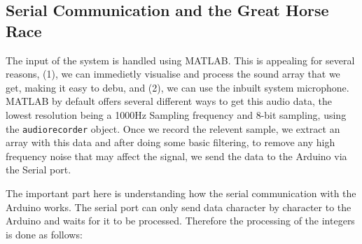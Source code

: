 \subsection{Serial Communication and the Great Horse Race}
\label{subsec:buffinp}
The input of the system is handled using MATLAB. This is appealing for several
reasons, (1), we can immedietly visualise and process the sound array that we
get, making it easy to debu, and (2), we can use the inbuilt system microphone.
MATLAB by default offers several different ways to get this audio data, the
lowest resolution being a 1000Hz Sampling frequency and 8-bit sampling, using
the \texttt{audiorecorder} object. Once we record the relevent sample, we
extract an array with this data and after doing some basic filtering, to remove
any high frequency noise that may affect the signal, we send the data to the
Arduino via the Serial port. 

The important part here is understanding how the serial communication with the
Arduino works. The serial port can only send data character by character to the
Arduino and waits for it to be processed. Therefore the processing of the
integers is done as follows: 

